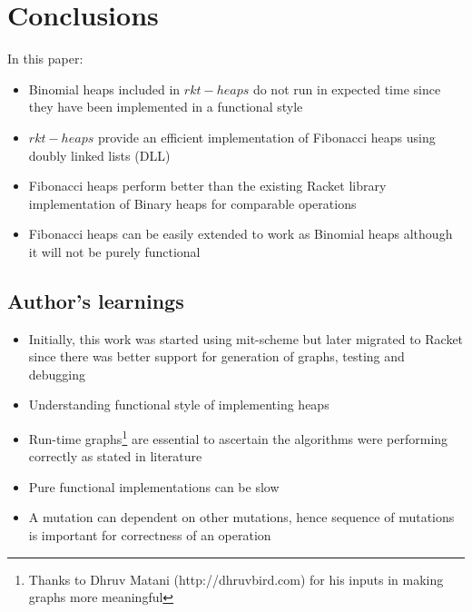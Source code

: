 \documentclass{llncs}
\begin{document}
\section{Conclusions}
In this paper:
\begin{itemize}
	\item Binomial heaps included in $rkt-heaps$ do not run in expected time since they have been implemented in a functional style
	\item $rkt-heaps$ provide an efficient implementation of Fibonacci heaps using doubly linked lists (DLL)
	\item Fibonacci heaps perform better than the existing Racket library implementation of Binary heaps for comparable operations
	\item Fibonacci heaps can be easily extended to work as Binomial heaps although it will not be purely functional
\end{itemize}

\subsection{Author's learnings}
\begin{itemize}
	\item Initially, this work was started using mit-scheme but later migrated to Racket since there was better support for generation of graphs, testing and debugging
	\item Understanding functional style of implementing heaps
	\item Run-time graphs\footnote{Thanks to Dhruv Matani (http://dhruvbird.com) for his inputs in making graphs more meaningful} are essential to ascertain the algorithms were performing correctly as stated in literature
	\item Pure functional implementations can be slow 
    \item A mutation can dependent on other mutations, hence sequence of mutations is important for correctness of an operation
\end{itemize}
		




\newpage
\appendix


\newpage
\end{document}
